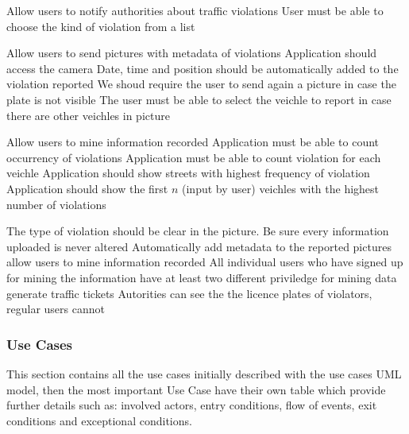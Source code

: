 \begin{enumerate}
   Allow users to notify authorities about traffic violations %
   User must be able to choose the kind of violation from a list



   Allow users to send pictures with metadata of violations %
   Application should access the camera
   Date, time and position should be automatically added to the violation reported
  \req{}  We shoud require the user to send again a picture in case the plate is not visible
  \req{}  The user must be able to select the veichle to report in case there are other veichles in picture

   Allow users to mine information recorded  %
   Application must be able to count occurrency of violations
    Application must be able to count violation for each veichle
   Application should show streets with highest frequency of violation
  \req {}  Application should show the first $n$ (input by user) veichles with the highest number of violations




   The type of violation should be clear in the picture.
   Be sure every information uploaded is never altered
   Automatically add metadata to the reported pictures
   allow users to mine information recorded
  \req{} All individual users who have signed up for mining the information
  \goal{} have at least two different  priviledge for mining data
   generate traffic tickets
   Autorities can see the the licence plates of violators, regular users cannot



\subsubsection{Use Cases}
This section contains all the use cases initially described with the use cases UML model, then the most important Use Case have their own table which provide further details such as:  involved actors, entry conditions,  ﬂow of events, exit conditions and exceptional conditions.






\end{enumerate}
